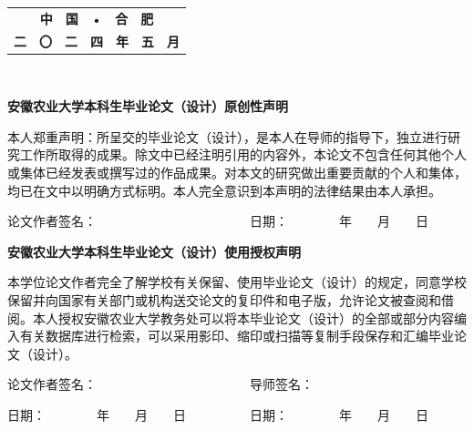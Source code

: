 \documentclass[UTF8,a4paper,12pt]{ctexart}
\begin{document}
	\vspace{4cm} 
	\begin{table}[!h]
		\renewcommand\arraystretch{2}
		\setlength\tabcolsep{16pt}
		\centering
		\begin{tabular}{c}
			\textbf{\fontsize{16pt}{\baselineskip}\heiti 中　国　•　合　肥 }\\
			\textbf{\fontsize{16pt}{\baselineskip}\heiti 二　〇　二　四　年　五　月} \\
		\end{tabular}
	\end{table}
	\thispagestyle{empty}
	\newpage　
	\vspace{1cm} \par \textbf{\fontsize{18pt}{\baselineskip}\heiti 安徽农业大学本科生毕业论文（设计）原创性声明}
	\vspace{1cm} \par 本人郑重声明：所呈交的毕业论文（设计），是本人在导师的指导下，独立进行研究工作所取得的成果。除文中已经注明引用的内容外，本论文不包含任何其他个人或集体已经发表或撰写过的作品成果。对本文的研究做出重要贡献的个人和集体，均已在文中以明确方式标明。本人完全意识到本声明的法律结果由本人承担。
	\vspace{1cm} \par 论文作者签名：　　　　　　　　　　　　日期：　　　　年　　月　　日
	\vspace{6cm} \par \textbf{\fontsize{18pt}{\baselineskip}\heiti  安徽农业大学本科生毕业论文（设计）使用授权声明}
	\vspace{1cm} \par 本学位论文作者完全了解学校有关保留、使用毕业论文（设计）的规定，同意学校保留并向国家有关部门或机构送交论文的复印件和电子版，允许论文被查阅和借阅。本人授权安徽农业大学教务处可以将本毕业论文（设计）的全部或部分内容编入有关数据库进行检索，可以采用影印、缩印或扫描等复制手段保存和汇编毕业论文（设计）。
	\vspace{1cm} \par 论文作者签名：　　　　　　　　　　　　导师签名：
	\vspace{0.5cm} \par 日期：　　　　年　　月　　日　　　　　日期：　　　　年　　月　　日
	\thispagestyle{empty}
	
	\newpage
	
\end{document}
